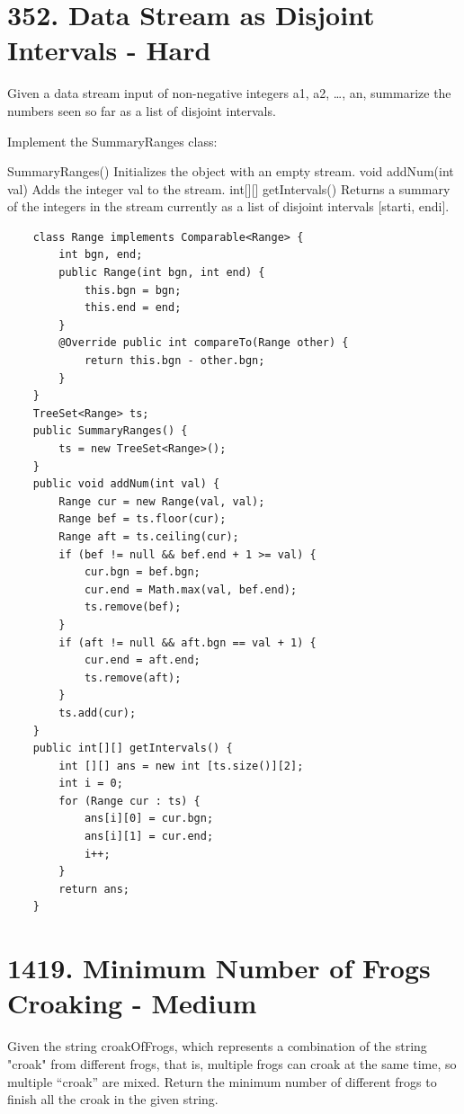 \documentclass[9pt, b5paaper]{book}
\begin{document}
\section{352. Data Stream as Disjoint Intervals - Hard}
\label{sec-19-5}
Given a data stream input of non-negative integers a1, a2, \ldots{}, an, summarize the numbers seen so far as a list of disjoint intervals.

Implement the SummaryRanges class:

SummaryRanges() Initializes the object with an empty stream.
void addNum(int val) Adds the integer val to the stream.
int[][] getIntervals() Returns a summary of the integers in the stream currently as a list of disjoint intervals [starti, endi].
\begin{verbatim}
    class Range implements Comparable<Range> {
        int bgn, end;
        public Range(int bgn, int end) {
            this.bgn = bgn;
            this.end = end;
        }
        @Override public int compareTo(Range other) {
            return this.bgn - other.bgn;
        }
    }
    TreeSet<Range> ts; 
    public SummaryRanges() {
        ts = new TreeSet<Range>();
    }
    public void addNum(int val) {
        Range cur = new Range(val, val);
        Range bef = ts.floor(cur);
        Range aft = ts.ceiling(cur);
        if (bef != null && bef.end + 1 >= val) {
            cur.bgn = bef.bgn;
            cur.end = Math.max(val, bef.end);
            ts.remove(bef);
        }
        if (aft != null && aft.bgn == val + 1) {
            cur.end = aft.end;
            ts.remove(aft);
        }
        ts.add(cur);
    }
    public int[][] getIntervals() {
        int [][] ans = new int [ts.size()][2];
        int i = 0;
        for (Range cur : ts) {
            ans[i][0] = cur.bgn;
            ans[i][1] = cur.end;
            i++;
        }
        return ans;
    }
\end{verbatim}

\section{1419. Minimum Number of Frogs Croaking - Medium}
\label{sec-19-6}
Given the string croakOfFrogs, which represents a combination of the string "croak" from different frogs, that is, multiple frogs can croak at the same time, so multiple “croak” are mixed. Return the minimum number of different frogs to finish all the croak in the given string.
\end{document}
